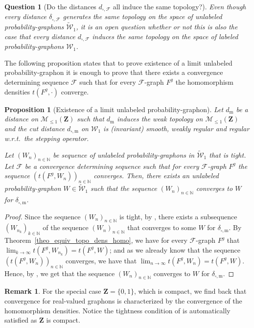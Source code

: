 \documentclass{amsart}
\newcommand{\wrt}{w.r.t.\ }
\theoremstyle{plain}
\newtheorem{prop}[Th]{Proposition}
\newtheorem{quest}[Th]{Question}
\theoremstyle{definition}
\newtheorem{remark}[Th]{Remark}
\newcommand{\Space}{\mathbf{Z}}
\newcommand{\SubProba}{\mathcal{M}_{\leq1}(\Space)}
\newcommand{\Graphon}{\mathcal{W}_1}
\newcommand{\UGraphon}{\widetilde{\mathcal{W}}_1}
\newcommand{\m}{\mathrm{m}}
\newcommand{\dmeas}{d_\m}
\newcommand{\dcut}{d_{\square,\m}}
\newcommand{\ddcut}{\delta_{\square,\m}}
\newcommand{\dcutF}{d_{\square,\mathcal{F}}}
\newcommand{\ddcutF}{\delta_{\square,\mathcal{F}}}
\newcommand{\F}{\mathcal{F}}
\newcommand{\N}{\mathbb{N}}
\begin{document}
\begin{quest}[Do the distances $\dcutF$ all induce the same topology?]
Even though every distance $\ddcutF$ generates the same
topology on the space of unlabeled probability-graphons 
$\UGraphon$,
it is an open question whether or not this is also the case that
every distance $\dcutF$ induces the same topology
on the space of labeled probability-graphons $\Graphon$.
\end{quest}

The following proposition states that to prove
existence of a limit unlabeled probability-graphon
it is enough to prove that there exists
a convergence determining sequence $\F$
such that for every $\F$-graph $F^g$
the homomorphism densities $t(F^g,\cdot)$ converge.

\begin{prop}[Existence of a limit unlabeled probability-graphon]
	\label{prop_existence_limit_graphon}
Let $\dmeas$ be a distance on $\SubProba$
such that $\dmeas$ induces the weak topology
	on $\SubProba$
and the cut distance $\dcut$ on $\Graphon$
is (invariant) smooth, weakly regular and 
regular \wrt the stepping operator.

Let $(W_n)_{n\in\N}$ be sequence of unlabeled probability-graphons in $\UGraphon$ that is tight.
Let $\F$ be a convergence determining sequence
such that for every $\F$-graph $F^g$
the sequence $(t(F^g,W_n))_{n\in\N}$ converges.
Then, there exists an unlabeled probability-graphon $W\in\UGraphon$
such that the sequence $(W_n)_{n\in\N}$ converges to $W$ for $\ddcut$.
\end{prop}

\begin{proof}
Since the sequence $(W_n)_{n\in\N}$ is tight,
by , there exists
a subsequence $(W_{n_k})_{k\in\N}$ of 
the sequence $(W_n)_{n\in\N}$ that converges to some $W$ for $\ddcut$.
By Theorem~\ref{theo_equiv_topo_dens_homo},
we have for every $\F$-graph $F^g$
that $\lim_{k\to\infty} t(F^g,W_{n_k}) = t(F^g,W)$;
and as we already know that the sequence
	$(t(F^g,W_n))_{n\in\N}$ converges,
we have that $\lim_{n\to \infty} t(F^g,W_n) = t(F^g, W)$.
Hence, by , we get
that the sequence $(W_n)_{n\in\N}$ converges to $W$ for $\ddcut$.
\end{proof}

\begin{remark}
For the special case $\Space = \{0,1\}$, which is compact,
we find back that convergence for real-valued graphons
is characterized by the convergence of the homomorphism densities.
Notice the tightness condition of 
is automatically satisfied as $\Space$ is compact.
\end{remark}
\end{document}
